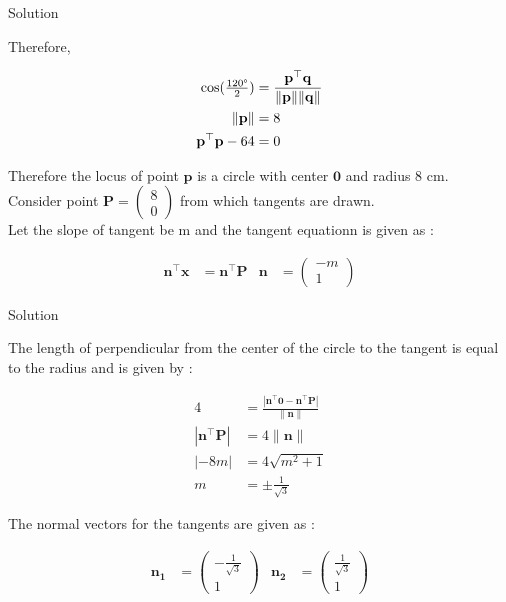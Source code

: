 \documentclass{beamer}
\numberwithin{equation}{section}
\theoremstyle{remark}
\providecommand{\norm}[1]{\lVert#1\rVert}
\newcommand{\myvec}[1]{\ensuremath{\begin{pmatrix}#1\end{pmatrix}}}
\let\vec\mathbf
\begin{document}
\begin{frame}{Solution}

Therefore,

\begin{align}
  \cos(\tfrac{120\degree}{2}) &= \frac{\vec{p}^\top\vec{q}}{\norm{\vec{p}}\norm{\vec{q}}}\\
  \norm{\vec{p}} &= 8\\
  \vec{p}^\top\vec{p} - 64 &= 0
\end{align}

Therefore the locus of point $\vec{p}$ is a circle with center $\vec{0}$ and radius 8 cm.\\

Consider point $\vec{P} = \myvec{8\\0}$ from which tangents are drawn.\\

Let the slope of tangent be m and the tangent equationn is given as :

\begin{align}
  \vec{n}^\top\vec{x} &= \vec{n}^\top\vec{P} & \vec{n} &= \myvec{-m\\1}
\end{align}

\end{frame}

\begin{frame}{Solution}

The length of perpendicular from the center of the circle to the tangent is equal to the radius and is given by :

\begin{align}
  4 &= \frac{|\vec{n}^\top\vec{0} - \vec{n}^\top\vec{P}|}{\norm{\vec{n}}}\\
  |\vec{n}^\top\vec{P}| &= 4\norm{\vec{n}}\\
  |-8m| &= 4\sqrt{m^2 + 1}\\
  m &= \pm \frac{1}{\sqrt{3}}
\end{align}

The normal vectors for the tangents are given as :

\begin{align}
  \vec{n_1} &= \myvec{-\tfrac{1}{\sqrt{3}}\\1} & \vec{n_2} &= \myvec{\tfrac{1}{\sqrt{3}}\\1} 
\end{align}

\end{frame}
\end{document}
